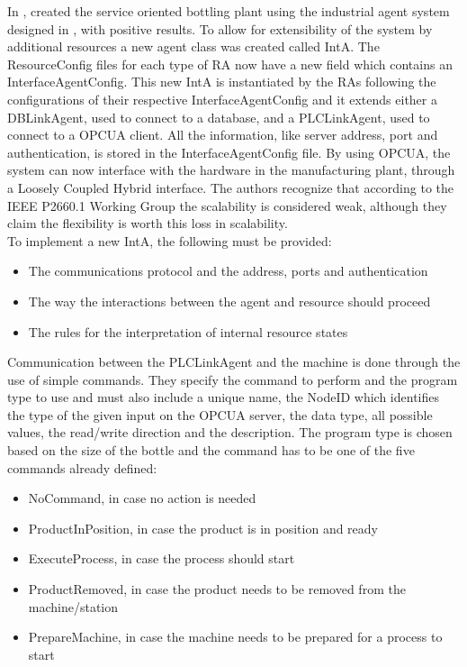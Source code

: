 In \cite{bottling_plant_part2}, \citeauthor{bottling_plant_part2} created the service oriented bottling plant using the industrial agent system designed in \cite{bottling_plant_part1}, with positive results. To allow for extensibility of the system by additional resources a new agent class was created called \gls{IntA}. The ResourceConfig files for each type of \gls{RA} now have a new field which contains an InterfaceAgentConfig. This new \gls{IntA} is instantiated by the \gls{RA}s following the configurations of their respective InterfaceAgentConfig and it extends either a DBLinkAgent, used to connect to a database, and a PLCLinkAgent, used to connect to a \gls{OPCUA} client. All the information, like server address, port and authentication, is stored in the InterfaceAgentConfig file. By using \gls{OPCUA}, the system can now interface with the hardware in the manufacturing plant, through a Loosely Coupled Hybrid interface. The authors recognize that according to the IEEE P2660.1 Working Group the scalability is considered weak, although they claim the flexibility is worth this loss in scalability.\\

To implement a new \gls{IntA}, the following must be provided:
\begin{itemize}
	\item The communications protocol and the address, ports and authentication
	\item The way the interactions between the agent and resource should proceed
	\item The rules for the interpretation of internal resource states
\end{itemize}

Communication between the PLCLinkAgent and the machine is done through the use of simple commands. They specify the command to perform and the program type to use and must also include a unique name, the NodeID which identifies the type of the given input on the \gls{OPCUA} server, the data type, all possible values, the read/write direction and the description. The program type is chosen based on the size of the bottle and the command has to be one of the five commands already defined:

\begin{itemize}
	\item NoCommand, in case no action is needed
	\item ProductInPosition, in case the product is in position and ready
	\item ExecuteProcess, in case the process should start
	\item ProductRemoved, in case the product needs to be removed from the machine/station
	\item PrepareMachine, in case the machine needs to be prepared for a process to start
\end{itemize}

